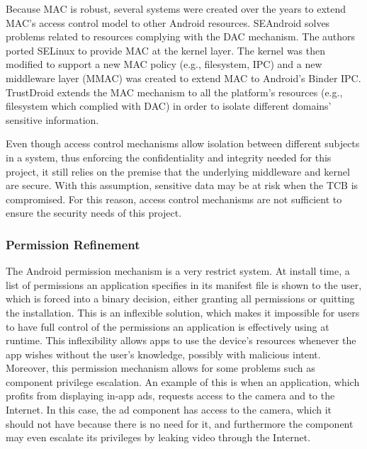 Because \ac{MAC} is robust, several systems were created over the years to extend \ac{MAC}'s access control model to other Android resources. SEAndroid \cite{smalley2013security} solves problems related to resources complying with the \ac{DAC} mechanism. The authors ported SELinux \cite{peter2001integrating} to provide \ac{MAC} at the kernel layer. The kernel was then modified to support a new \ac{MAC} policy (e.g., filesystem, IPC) and a new middleware layer (MMAC) was created to extend \ac{MAC} to Android's Binder IPC. TrustDroid \cite{bugiel2011practical} extends the \ac{MAC} mechanism to all the platform's resources (e.g., filesystem which complied with DAC) in order to isolate different domains' sensitive information.

Even though access control mechanisms allow isolation between different subjects in a system, thus enforcing the confidentiality and integrity needed for this project, it still relies on the premise that the underlying middleware and kernel are secure. With this assumption, sensitive data may be at risk when the \ac{TCB} is compromised. For this reason, access control mechanisms are not sufficient to ensure the security needs of this project.  

\subsubsection{Permission Refinement}
\label{sec:permissionrefinement}

The Android permission mechanism is a very restrict system. At install time, a list of permissions an application specifies in its manifest file is shown to the user, which is forced into a binary decision, either granting all permissions or quitting the installation. This is an inflexible solution, which makes it impossible for users to have full control of the permissions an application is effectively using at runtime. This inflexibility allows apps to use the device's resources whenever the app wishes without the user's knowledge, possibly with malicious intent. Moreover, this permission mechanism allows for some problems such as component privilege escalation. An example of this is when an application, which profits from displaying in-app ads, requests access to the camera and to the Internet. In this case, the ad component has access to the camera, which it should not have because there is no need for it, and furthermore the component may even escalate its privileges by leaking video through the Internet.

